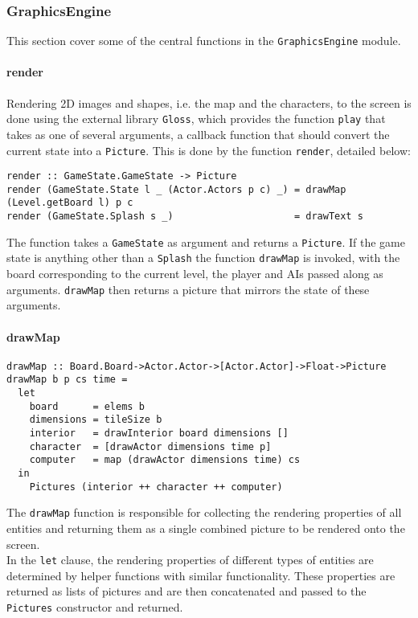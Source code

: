 \documentclass{article}
\begin{document}
        \subsubsection{GraphicsEngine}
        This section cover some of the central functions in the \texttt{GraphicsEngine} module.
        \paragraph{render}
        Rendering 2D images and shapes, i.e. the map and the characters, to the screen is done using the external library \texttt{Gloss}, which provides the function \texttt{play} that takes as one of several arguments, a callback function that should convert the current state into a \texttt{Picture}. This is done by the function \texttt{render}, detailed below:
        \begin{verbatim}
render :: GameState.GameState -> Picture
render (GameState.State l _ (Actor.Actors p c) _) = drawMap (Level.getBoard l) p c
render (GameState.Splash s _) 					  = drawText s
        \end{verbatim}
The function takes a \texttt{GameState} as argument and returns a \texttt{Picture}. If the game state is anything other than a \texttt{Splash} the function \texttt{drawMap} is invoked, with the board corresponding to the current level,  the player and AIs passed along as arguments. \texttt{drawMap} then returns a picture that mirrors the state of these arguments.
        \paragraph{drawMap}
        \begin{verbatim}
drawMap :: Board.Board->Actor.Actor->[Actor.Actor]->Float->Picture
drawMap b p cs time =
  let
    board      = elems b
    dimensions = tileSize b
    interior   = drawInterior board dimensions []
    character  = [drawActor dimensions time p]
    computer   = map (drawActor dimensions time) cs
  in
    Pictures (interior ++ character ++ computer)
        \end{verbatim}
        The \texttt{drawMap} function is responsible for collecting the rendering properties of all entities and returning them as a single combined picture to be rendered onto the screen.\\
        \newline
In the \texttt{let} clause, the rendering properties of different types of entities are determined by helper functions with similar functionality. These properties are returned as lists of pictures and are then concatenated and passed to the \texttt{Pictures} constructor and returned.
\end{document}
